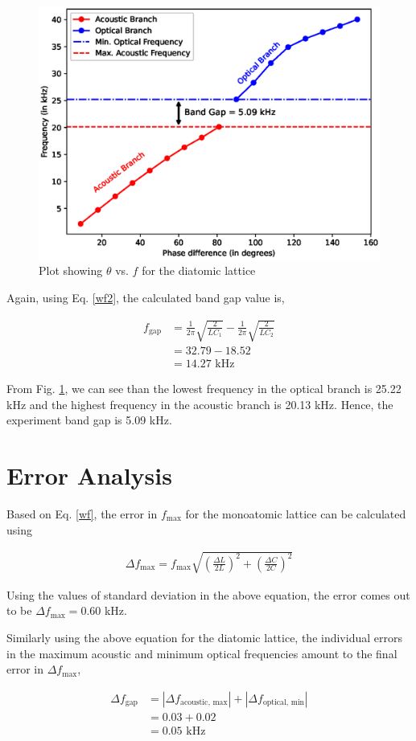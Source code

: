 \begin{figure}
    \centering
    \includegraphics[width=1\columnwidth]{images/di.eps}
    \caption{Plot showing $\theta$ vs. $f$ for the diatomic lattice}
    \label{g2}
\end{figure}

Again, using Eq. \ref{wf2}, the calculated band gap value is,

\begin{align*}
    f_\text{gap} &= \frac{1}{2\pi}\sqrt{\frac{2}{LC_1}} - \frac{1}{2\pi}\sqrt{\frac{2}{LC_2}}\\
    &= 32.79 - 18.52 \\&= 14.27 \text{ kHz}
\end{align*}

From Fig. \ref{g2}, we can see than the lowest frequency in the optical branch is 25.22 kHz and the highest frequency in the acoustic branch is 20.13 kHz. Hence, the experiment band gap is 5.09 kHz.

\section{Error Analysis}

Based on Eq. \ref{wf}, the error in $f_\text{max}$ for the monoatomic lattice can be calculated using

\begin{align}
    \Delta f_\text{max} = f_\text{max}\sqrt{\left(\frac{\Delta L}{2L}\right)^2 + \left(\frac{\Delta C}{2C}\right)^2}
\end{align}

Using the values of standard deviation in the above equation, the error comes out to be $\Delta f_\text{max} = 0.60$ kHz.

Similarly using the above equation for the diatomic lattice, the individual errors in the maximum acoustic and minimum optical frequencies amount to the final error in $\Delta f_\text{max}$,

\begin{align*}
    \Delta f_\text{gap} &= |\Delta f_\text{acoustic, max}| + |\Delta f_\text{optical, min}|\\
    &= 0.03 + 0.02 \\
    &= 0.05 \text{ kHz}
\end{align*}